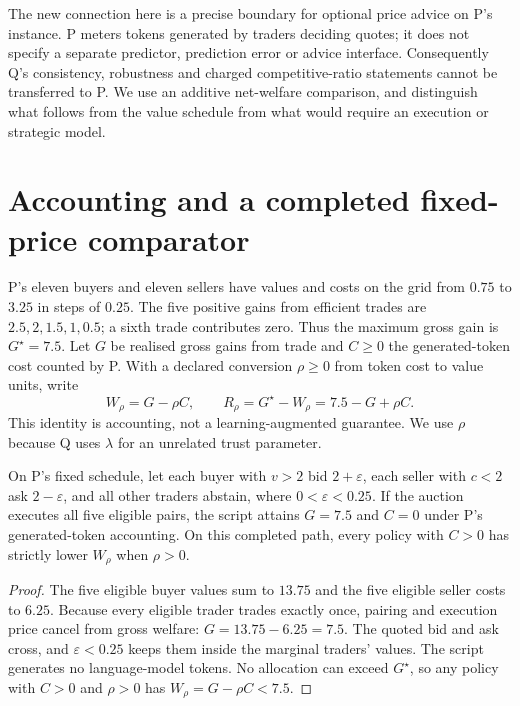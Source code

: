 \documentclass{article}
\begin{document}
The new connection here is a precise boundary for optional price advice on P's instance. P meters tokens
generated by traders deciding quotes; it does not specify a separate predictor, prediction error or advice
interface. Consequently Q's consistency, robustness and charged competitive-ratio statements cannot be
transferred to P. We use an additive net-welfare comparison, and distinguish what follows from the value
schedule from what would require an execution or strategic model.

\section{Accounting and a completed fixed-price comparator}

P's eleven buyers and eleven sellers have values and costs on the grid from \(0.75\) to \(3.25\) in steps of
\(0.25\). The five positive gains from efficient trades are \(2.5,2,1.5,1,0.5\); a sixth trade contributes
zero. Thus the maximum gross gain is \(G^{\star}=7.5\). Let \(G\) be realised gross gains from trade and
\(C\geq0\) the generated-token cost counted by P. With a declared conversion \(\rho\geq0\) from token cost
to value units, write
\[
W_{\rho}=G-\rho C,\qquad
R_{\rho}=G^{\star}-W_{\rho}=7.5-G+\rho C.
\]
This identity is accounting, not a learning-augmented guarantee. We use \(\rho\) because Q uses \(\lambda\)
for an unrelated trust parameter.

\begin{proposition}
On P's fixed schedule, let each buyer with \(v>2\) bid \(2+\varepsilon\), each seller with \(c<2\) ask
\(2-\varepsilon\), and all other traders abstain, where \(0<\varepsilon<0.25\). If the auction executes all
five eligible pairs, the script attains \(G=7.5\) and \(C=0\) under P's generated-token accounting. On this
completed path, every policy with \(C>0\) has strictly lower \(W_{\rho}\) when \(\rho>0\).
\end{proposition}

\begin{proof}
The five eligible buyer values sum to \(13.75\) and the five eligible seller costs to \(6.25\). Because
every eligible trader trades exactly once, pairing and execution price cancel from gross welfare:
\(G=13.75-6.25=7.5\). The quoted bid and ask cross, and \(\varepsilon<0.25\) keeps them inside the marginal
traders' values. The script generates no language-model tokens. No allocation can exceed \(G^{\star}\), so
any policy with \(C>0\) and \(\rho>0\) has \(W_{\rho}=G-\rho C<7.5\).
\end{proof}
\end{document}
